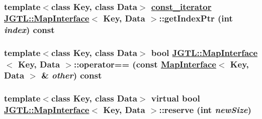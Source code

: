 \hypertarget{class_j_g_t_l_1_1_map_interface_f5cfdb7ca92b031a3ec4835c02a64d97}{
\subsubsection[getIndexPtr]{\setlength{\rightskip}{0pt plus 5cm}template$<$class Key, class Data$>$ \hyperlink{class_j_g_t_l_1_1_map_interface_bbce6cc516069a5a504e0ae5b9aecd88}{const\_\-iterator} \hyperlink{class_j_g_t_l_1_1_map_interface}{JGTL::Map\-Interface}$<$ Key, Data $>$::get\-Index\-Ptr (int {\em index}) const}}
\label{class_j_g_t_l_1_1_map_interface_f5cfdb7ca92b031a3ec4835c02a64d97}


\hypertarget{class_j_g_t_l_1_1_map_interface_2f61fdf95543ba566256642eeed659f4}{
\subsubsection[operator==]{\setlength{\rightskip}{0pt plus 5cm}template$<$class Key, class Data$>$ bool \hyperlink{class_j_g_t_l_1_1_map_interface}{JGTL::Map\-Interface}$<$ Key, Data $>$::operator== (const \hyperlink{class_j_g_t_l_1_1_map_interface}{Map\-Interface}$<$ Key, Data $>$ \& {\em other}) const}}
\label{class_j_g_t_l_1_1_map_interface_2f61fdf95543ba566256642eeed659f4}


\hypertarget{class_j_g_t_l_1_1_map_interface_d5d7c32e4e413ef6fcd93ca53951ecf8}{
\subsubsection[reserve]{\setlength{\rightskip}{0pt plus 5cm}template$<$class Key, class Data$>$ virtual bool \hyperlink{class_j_g_t_l_1_1_map_interface}{JGTL::Map\-Interface}$<$ Key, Data $>$::reserve (int {\em new\-Size})}}
\label{class_j_g_t_l_1_1_map_interface_d5d7c32e4e413ef6fcd93ca53951ecf8}




